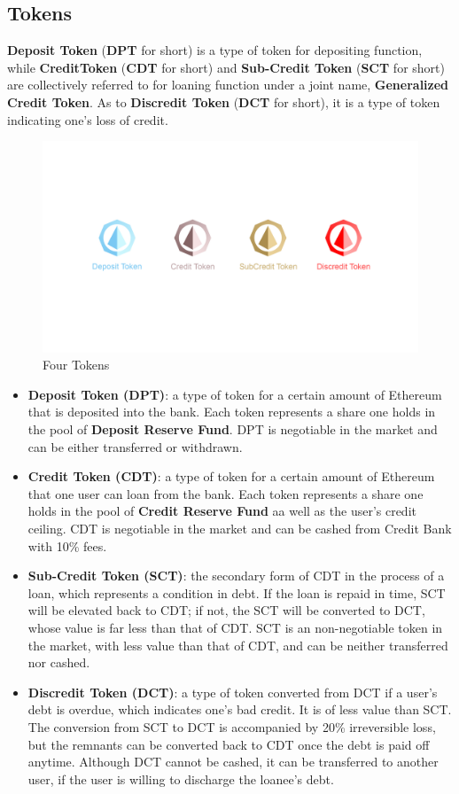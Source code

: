 \documentclass[review]{elsarticle}
\begin{document}
\subsection{Tokens}
\textbf{Deposit Token} (\textbf{DPT} for short) is a type of token for depositing function, while \textbf{CreditToken} (\textbf{CDT} for short) and \textbf{Sub-Credit Token} (\textbf{SCT} for short) are collectively referred to for loaning function under a joint name, \textbf{Generalized Credit Token}. As to \textbf{Discredit Token} (\textbf{DCT} for short), it is a type of token indicating one's loss of credit.

\begin{figure}[H]
\begin{center}
\includegraphics[width=4.5in]{Graphs/logos-line.jpg}
\end{center}
\caption{Four Tokens}\label{FT}
\end{figure}

\begin{itemize} 
   \item \textbf{Deposit Token (DPT)}: a type of token for a certain amount of Ethereum that is deposited into the bank. Each token represents a share one holds in the pool of \textbf{Deposit Reserve Fund}. DPT is negotiable in the market and can be either transferred or withdrawn.
   \item \textbf{Credit Token (CDT)}: a type of token for a certain amount of Ethereum that one user can loan from the bank. Each token represents a share one holds in the pool of \textbf{Credit Reserve Fund} aa well as the user's credit ceiling. CDT is negotiable in the market and can be cashed from Credit Bank with 10\% fees.
   \item \textbf{Sub-Credit Token (SCT)}: the secondary form of CDT in the process of a loan, which represents a condition in debt. If the loan is repaid in time, SCT will be elevated back to CDT; if not, the SCT will be converted to DCT, whose value is far less than that of CDT. SCT is an non-negotiable token in the market, with less value than that of CDT, and can be neither transferred nor cashed.
   \item \textbf{Discredit Token (DCT)}: a type of token converted from DCT if a user's debt is overdue, which indicates one's bad credit. It is of less value than SCT. The conversion from SCT to DCT is accompanied by 20\% irreversible loss, but the remnants can be converted back to CDT once the debt is paid off anytime. Although DCT cannot be cashed, it can be transferred to another user, if the user is willing to discharge the loanee's debt.
\end{itemize}
\end{document}
